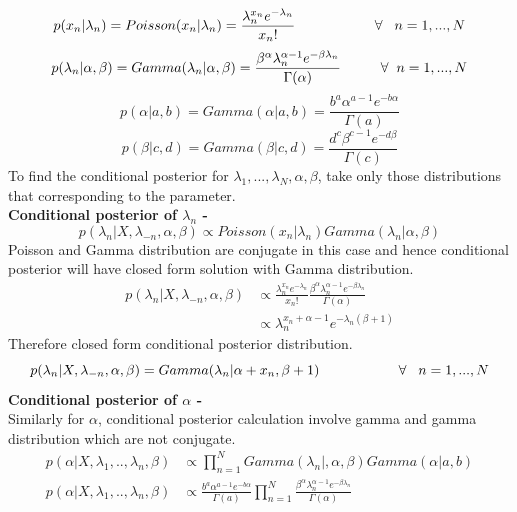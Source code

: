 \documentclass[a4paper,11pt]{article}
\begin{document}
\begin{pmisolution}
\[p(x_n|\lambda_n) = Poisson(x_n|\lambda_n) = \frac{\lambda_n^{x_n} e^{-\lambda_n}}{x_n!} \hspace{2cm} \forall \hspace{0.3cm} n=1,...,N\]
\[p(\lambda_n|\alpha,\beta) = Gamma(\lambda_n|\alpha,\beta)= \frac{\beta^{\alpha}\lambda_n^{\alpha-1}e^{-\beta\lambda_n}}{\Gamma(\alpha)} \hspace{1cm} \forall \hspace{0.2cm} n = 1,...,N\]
\[p(\alpha|a,b) = Gamma(\alpha|a,b)= \frac{b^{a}\alpha^{a-1}e^{-b\alpha}}{\Gamma(a)}\]
\[p(\beta|c,d) = Gamma(\beta|c,d)= \frac{d^{c}\beta^{c-1}e^{-d\beta}}{\Gamma(c)} \]
To find the conditional posterior for \(\lambda_1,..., \lambda_N, \alpha,\beta\), take only those distributions that corresponding to the parameter.\\
\textbf{Conditional posterior of \(\lambda_n\) -}\\
\[p(\lambda_n|X,\lambda_{-n},\alpha,\beta) \propto Poisson(x_n|\lambda_n)  Gamma(\lambda_n|\alpha,\beta)\]
Poisson and Gamma distribution are conjugate in this case and hence conditional posterior will have closed form solution with Gamma distribution.
\begin{align*}
    p(\lambda_n|X,\lambda_{-n},\alpha,\beta) &\propto \frac{\lambda_n^{x_n} e^{-\lambda_n}}{x_n!} \frac{\beta^\alpha\lambda_n^{\alpha-1}e^{-\beta\lambda_n}}{\Gamma(\alpha)}\\
    &\propto \lambda_n^{x_n + \alpha -1} e^{-\lambda_n(\beta+1)}
\end{align*}
Therefore closed form conditional posterior distribution.
\[p(\lambda_n|X,\lambda_{-n},\alpha,\beta) = Gamma(\lambda_n|\alpha + x_n, \beta + 1) \hspace{2cm} \forall \hspace{0.3cm} n = 1,...,N\]
\textbf{Conditional posterior of \(\alpha\) -}\\
Similarly for \(\alpha\), conditional posterior calculation involve gamma and gamma distribution which are not conjugate.\\
\begin{align*}
    p(\alpha|X,\lambda_{1},..,\lambda_n,\beta) &\propto \prod_{n=1}^{N}Gamma(\lambda_n|,\alpha,\beta)Gamma(\alpha|a,b)\\
    p(\alpha|X,\lambda_{1},..,\lambda_n,\beta) &\propto \frac{b^{a}\alpha^{a-1}e^{-b\alpha}}{\Gamma(a)}\prod_{n=1}^{N} \frac{\beta^{\alpha}\lambda_n^{\alpha-1}e^{-\beta\lambda_n}}{\Gamma(\alpha)}\\

\end{align*}
\end{pmisolution}
\end{document}
